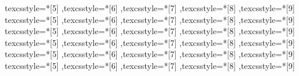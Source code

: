   {
     texcsstyle=*[5]{\bfseries\color{ekvred}}  %
    ,texcsstyle=*[6]{\color{ekvred}}           %
    ,texcsstyle=*[7]{\color{ekvred}}           %
    ,texcsstyle=*[8]{\color{ekvred}}           %
    ,texcsstyle=*[9]{\color{ekvred}}           %
  }
  {
     texcsstyle=*[5]{\color{ekvred}}           %
    ,texcsstyle=*[6]{\bfseries\color{ekvred}}  %
    ,texcsstyle=*[7]{\color{ekvred}}           %
    ,texcsstyle=*[8]{\color{ekvred}}           %
    ,texcsstyle=*[9]{\color{ekvred}}           %
  }
  {
     texcsstyle=*[5]{\color{ekvred}}           %
    ,texcsstyle=*[6]{\color{ekvred}}           %
    ,texcsstyle=*[7]{\bfseries\color{ekvred}}  %
    ,texcsstyle=*[8]{\color{ekvred}}           %
    ,texcsstyle=*[9]{\color{ekvred}}           %
  }
  {
     texcsstyle=*[5]{\color{ekvred}}           %
    ,texcsstyle=*[6]{\color{ekvred}}           %
    ,texcsstyle=*[7]{\color{ekvred}}           %
    ,texcsstyle=*[8]{\bfseries\color{ekvred}}  %
    ,texcsstyle=*[9]{\color{ekvred}}           %
  }
  {
     texcsstyle=*[5]{\color{ekvred}}           %
    ,texcsstyle=*[6]{\color{ekvred}}           %
    ,texcsstyle=*[7]{\color{ekvred}}           %
    ,texcsstyle=*[8]{\color{ekvred}}           %
    ,texcsstyle=*[9]{\bfseries\color{ekvred}}  %
  }
  {
     texcsstyle=*[5]{\bfseries\color{ekvred}}  %
    ,texcsstyle=*[6]{\bfseries\color{ekvred}}  %
    ,texcsstyle=*[7]{\bfseries\color{ekvred}}  %
    ,texcsstyle=*[8]{\bfseries\color{ekvred}}  %
    ,texcsstyle=*[9]{\bfseries\color{ekvred}}  %
  }
\lstset
